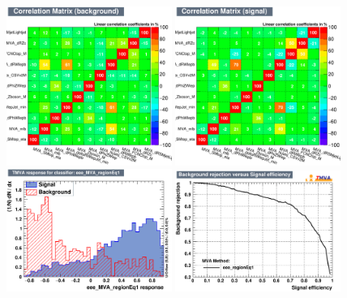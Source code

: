 \begin{figure}[htbp]
	\includegraphics[width=0.48\textwidth]{6_Search/Figures/MVAtechnics/toppairzut/eee/CorrelationMatrixB.png}
	\includegraphics[width=0.48\textwidth]{6_Search/Figures/MVAtechnics/toppairzut/eee/CorrelationMatrixS.png}
	\includegraphics[width=0.48\textwidth]{6_Search/Figures/MVAtechnics/toppairzut/eee/mva_eee_MVA_regionEq1.png}
	\includegraphics[width=0.48\textwidth]{6_Search/Figures/MVAtechnics/toppairzut/eee/rejBvsS.png}

\end{figure}
